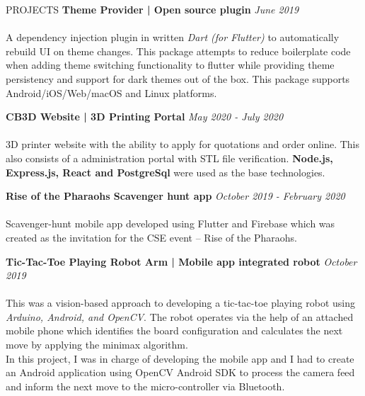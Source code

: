 \documentclass{cv}
\begin{document}
\begin{rSection}{PROJECTS}
    {\bf Theme Provider | Open source plugin}                       \hfill {\em June 2019}
    \\ \\
    A dependency injection plugin in written \textit{Dart (for Flutter)} to automatically rebuild
    UI on theme changes.
    This package attempts to reduce boilerplate code when adding theme switching functionality to flutter
    while providing theme persistency and support for dark themes out of the box.
    This package supports Android/iOS/Web/macOS and Linux platforms. \par

    {\bf CB3D Website | 3D Printing Portal}                  \hfill {\em May 2020 - July 2020}
    \\ \\
    3D printer website with the ability to apply for quotations and order online.
    This also consists of a administration portal with STL file verification.
    \textbf{Node.js, Express.js, React and PostgreSql} were used as the base technologies.
    \par

    {\bf Rise of the Pharaohs Scavenger hunt app}                   \hfill {\em October 2019 - February 2020}
    \\ \\
    Scavenger-hunt mobile app developed using Flutter and Firebase which was created as the invitation
    for the CSE event – Rise of the Pharaohs.  \par

    {\bf Tic-Tac-Toe Playing Robot Arm | Mobile app integrated robot}     \hfill {\em October 2019}
    \\ \\
    This was a vision-based approach to developing a tic-tac-toe playing robot using \textit{Arduino, Android, and OpenCV}.
    The robot operates via the help of an attached mobile phone which identifies the board configuration
    and calculates the next move by applying the minimax algorithm.\\
    In this project, I was in charge of developing the mobile app and I had to create an Android application
    using OpenCV Android SDK to process the camera feed and inform the next move to the micro-controller via Bluetooth. \par


\end{rSection}
\end{document}
